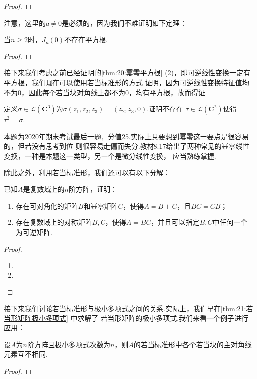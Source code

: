 \begin{proof}
    
\end{proof}

注意，这里的$a\neq 0$是必须的，因为我们不难证明如下定理：
\begin{theorem}
    当$n\geqslant 2$时，$J_n(0)$不存在平方根.
\end{theorem}
\begin{proof}
    
\end{proof}

接下来我们考虑之前已经证明的\autoref{thm:20:幂零平方根} (2)，即可逆线性变换一定有平方根，我们现在可以使用若当标准形的方式
证明，因为可逆线性变换特征值均不为0，因此每个若当块对角线上都不为0，均有平方根，故而得证.
\begin{example}
    定义$\sigma\in \mathcal{L}(\mathbf{C}^3)$为$\sigma(z_1,z_2,z_3)=(z_2,z_3,0)$.证明不存在
    $\tau\in \mathcal{L}(\mathbf{C}^3)$使得$\tau^2=\sigma$.
\end{example}
\begin{solution}

\end{solution}

本题为2020年期末考试最后一题，分值25.实际上只要想到幂零这一要点是很容易的，但若没有思考到位
则很容易走偏而失分.教材8.17给出了两种常见的幂零线性变换，一种是本题这一类型，另一个是微分线性变换，
应当熟练掌握.

除此之外，利用若当标准形，我们还可以有以下分解：
\begin{example}
    已知$A$是复数域上的$n$阶方阵，证明：
    \begin{enumerate}[label=(\arabic*)]
        \item 存在可对角化的矩阵$B$和幂零矩阵$C$，使得$A=B+C$，且$BC=CB$；

        \item 存在复数域上的对称矩阵$B,C$，使得$A=BC$，并且可以指定$B,C$中任何一个为可逆矩阵.
    \end{enumerate}
\end{example}
\begin{proof}
    \begin{enumerate}[label=(\arabic*)]
        \item 
        \item 
    \end{enumerate}
\end{proof}

接下来我们讨论若当标准形与极小多项式之间的关系.实际上，我们早在\autoref{thm:21:若当形矩阵极小多项式} 中求解了
若当形矩阵的极小多项式.我们来看一个例子进行应用：
\begin{example}
    设$A$为$n$阶方阵且极小多项式次数为$n$，则$A$的若当标准形中各个若当块的主对角线元素互不相同.
\end{example}
\begin{proof}
    
\end{proof}

